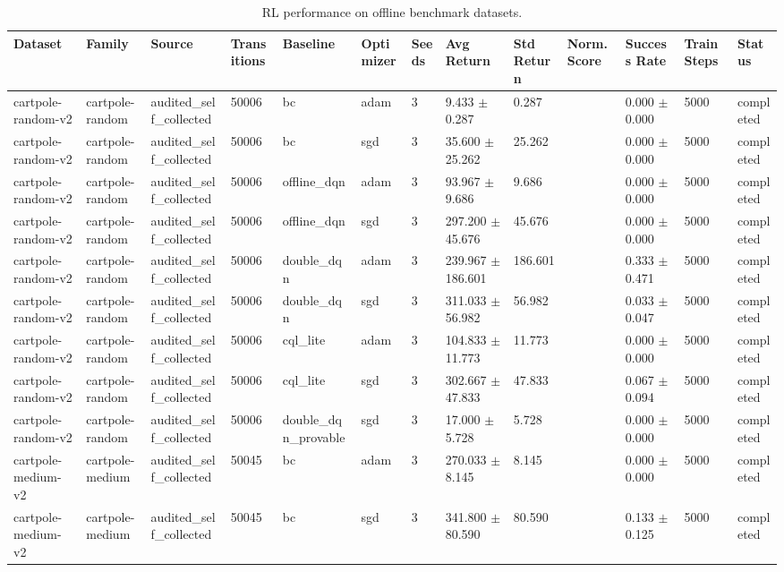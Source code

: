 \begin{table}[t]
\centering
\caption{RL performance on offline benchmark datasets.}
\label{tab:rl-performance}
\begin{tabular}{llllllllllll}
\toprule
Dataset & Family & Source & Transitions & Baseline & Optimizer & Seeds & Avg Return & Std Return & Norm. Score & Success Rate & Train Steps & Status \\
\midrule
cartpole-random-v2 & cartpole-random & audited\_self\_collected & 50006 & bc & adam & 3 & 9.433 $\pm$ 0.287 & 0.287 &  & 0.000 $\pm$ 0.000 & 5000 & completed \\
cartpole-random-v2 & cartpole-random & audited\_self\_collected & 50006 & bc & sgd & 3 & 35.600 $\pm$ 25.262 & 25.262 &  & 0.000 $\pm$ 0.000 & 5000 & completed \\
cartpole-random-v2 & cartpole-random & audited\_self\_collected & 50006 & offline\_dqn & adam & 3 & 93.967 $\pm$ 9.686 & 9.686 &  & 0.000 $\pm$ 0.000 & 5000 & completed \\
cartpole-random-v2 & cartpole-random & audited\_self\_collected & 50006 & offline\_dqn & sgd & 3 & 297.200 $\pm$ 45.676 & 45.676 &  & 0.000 $\pm$ 0.000 & 5000 & completed \\
cartpole-random-v2 & cartpole-random & audited\_self\_collected & 50006 & double\_dqn & adam & 3 & 239.967 $\pm$ 186.601 & 186.601 &  & 0.333 $\pm$ 0.471 & 5000 & completed \\
cartpole-random-v2 & cartpole-random & audited\_self\_collected & 50006 & double\_dqn & sgd & 3 & 311.033 $\pm$ 56.982 & 56.982 &  & 0.033 $\pm$ 0.047 & 5000 & completed \\
cartpole-random-v2 & cartpole-random & audited\_self\_collected & 50006 & cql\_lite & adam & 3 & 104.833 $\pm$ 11.773 & 11.773 &  & 0.000 $\pm$ 0.000 & 5000 & completed \\
cartpole-random-v2 & cartpole-random & audited\_self\_collected & 50006 & cql\_lite & sgd & 3 & 302.667 $\pm$ 47.833 & 47.833 &  & 0.067 $\pm$ 0.094 & 5000 & completed \\
cartpole-random-v2 & cartpole-random & audited\_self\_collected & 50006 & double\_dqn\_provable & sgd & 3 & 17.000 $\pm$ 5.728 & 5.728 &  & 0.000 $\pm$ 0.000 & 5000 & completed \\
cartpole-medium-v2 & cartpole-medium & audited\_self\_collected & 50045 & bc & adam & 3 & 270.033 $\pm$ 8.145 & 8.145 &  & 0.000 $\pm$ 0.000 & 5000 & completed \\
cartpole-medium-v2 & cartpole-medium & audited\_self\_collected & 50045 & bc & sgd & 3 & 341.800 $\pm$ 80.590 & 80.590 &  & 0.133 $\pm$ 0.125 & 5000 & completed \\

\end{tabular}
\end{table}
